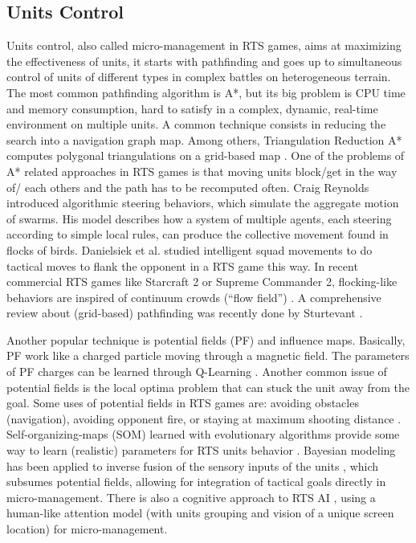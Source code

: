 \documentclass[journal]{IEEEtran}
\begin{document}
\subsection{Units Control}
Units control, also called micro-management in RTS games, aims at maximizing the effectiveness of units, it starts with pathfinding and goes up to simultaneous control of units of different types in complex battles on heterogeneous terrain. The most common pathfinding algorithm is A*, but its big problem is CPU time and memory consumption, hard to satisfy in a complex, dynamic, real-time environment on multiple units. %
A common technique consists in reducing the search into a navigation graph map. Among others, Triangulation Reduction A* computes polygonal triangulations on a grid-based map \cite{Demyen_2006}. One of the problems of A* related approaches in RTS games is that moving units block/get in the way of/ each others and the path has to be recomputed often. Craig Reynolds \cite{Reynolds_1999} introduced algorithmic steering behaviors, which simulate the aggregate motion of swarms. His model describes how a system of multiple agents, each steering according to simple local rules, can produce the collective movement found in flocks of birds. Danielsiek et al. \cite{Danielsiek_2008} studied intelligent squad movements to do tactical moves to flank the opponent in a RTS game this way. %
In recent commercial RTS games like Starcraft 2 or Supreme Commander 2, flocking-like behaviors are inspired of continuum crowds (``flow field'') \cite{Treuille2006}. A comprehensive review about (grid-based) pathfinding was recently done by Sturtevant \cite{sturtevant2012benchmarks}.

Another popular technique is potential fields (PF) and influence maps. Basically, PF work like a charged particle moving through a magnetic field. The parameters of PF charges can be learned through Q-Learning \cite{Liu_2008}. Another common issue of potential fields is the local optima problem that can stuck the unit away from the goal. Some uses of potential fields in RTS games are: avoiding obstacles (navigation), avoiding opponent fire, or staying at maximum shooting distance \cite{Hagelback08,Hagelback09}. Self-organizing-maps (SOM) learned with evolutionary algorithms provide some way to learn (realistic) parameters for RTS units behavior \cite{teamCompositionRTS}. Bayesian modeling has been applied to inverse fusion of the sensory inputs of the units \cite{SynnaeveMicroCig11}, which subsumes potential fields, allowing for integration of tactical goals directly in micro-management. There is also a cognitive approach to RTS AI \cite{SORTS}, using a human-like attention model (with units grouping and vision of a unique screen location) for micro-management.
\end{document}
